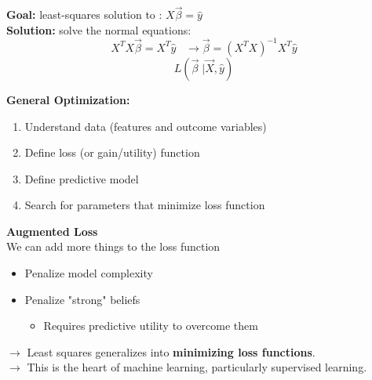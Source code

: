 \documentclass[letterpaper, 10.5pt,landscape]{article}
\begin{document}
\begin{multicols*}{3}
\textbf{Goal: }least-squares solution to : \(\boxed{X \Vec{\beta} = \hat{y} }\) \\
\textbf{Solution: } solve the normal equations:
\vspace{-2pt}
\[
    X^{T} X \Vec{\beta} = X^{T} \hat{y} 
    \hspace{10pt}  \rightarrow \vec{\beta}  = (X^{T}X)^{-1} X^{T} \hat{y} 
\]
\vspace{-7pt}
\[ \boxed{L(\Vec{\beta} \;| \Vec{X}, \hat{y} )} \]







\textbf{General Optimization: }\\
\vspace{-3pt}
\begin{enumerate}
    \item Understand data (features and outcome variables) 
    \vspace{-3pt}
    \item Define loss (or gain/utility) function
    \vspace{-3pt}
    \item Define predictive model
    \vspace{-3pt}
    \item Search for parameters that minimize loss function
    \vspace{-3pt}
\end{enumerate}



\textbf{Augmented Loss} \\
We can add more things to the loss function
\vspace{-3pt}
\begin{itemize}
    \item Penalize model complexity
    \vspace{-3pt}
    \item Penalize "strong" beliefs
    \vspace{-3pt}
    \begin{itemize}
        \vspace{-3pt}
        \item Requires predictive utility to overcome them
    \end{itemize}
\end{itemize}




$\rightarrow$ Least squares generalizes into \textbf{minimizing loss functions}. \\
$\rightarrow$ This is the heart of machine learning, particularly supervised learning.




\end{multicols*}
\end{document}

